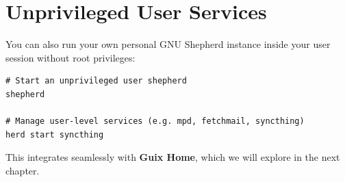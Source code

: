 \section{Unprivileged User Services}

You can also run your own personal GNU Shepherd instance inside your user session without root privileges:

\begin{lstlisting}[style=guixcli]
# Start an unprivileged user shepherd
shepherd

# Manage user-level services (e.g. mpd, fetchmail, syncthing)
herd start syncthing
\end{lstlisting}

This integrates seamlessly with \textbf{Guix Home}, which we will explore in the next chapter.

